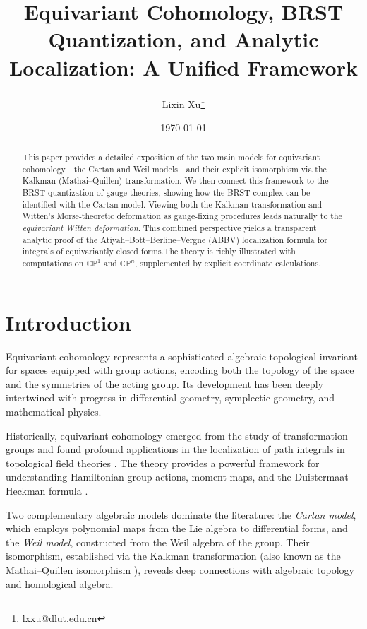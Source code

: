 \documentclass[10pt]{article}
\title{Equivariant Cohomology, BRST Quantization, and Analytic Localization: A Unified Framework}
\author{Lixin Xu\footnote{lxxu@dlut.edu.cn}}
\affil{Institute of Theoretical Physics, School of Physics, Dalian University of Technology, Dalian, 116024, China}
\date{\today}
\theoremstyle{definition}
\begin{document}
\maketitle

\begin{abstract}
This paper provides a detailed exposition of the two main models for equivariant cohomology---the Cartan and Weil models---and their explicit isomorphism via the Kalkman (Mathai--Quillen) transformation. We then connect this framework to the BRST quantization of gauge theories, showing how the BRST complex can be identified with the Cartan model. Viewing both the Kalkman transformation and Witten's Morse-theoretic deformation as gauge-fixing procedures leads naturally to the \emph{equivariant Witten deformation}. This combined perspective yields a transparent analytic proof of the Atiyah--Bott--Berline--Vergne (ABBV) localization formula for integrals of equivariantly closed forms.The theory is richly illustrated with computations on $\mathbb{CP}^1$ and $\mathbb{CP}^n$, supplemented by explicit coordinate calculations. 
\end{abstract}

\section{Introduction}\label{sec:intro}
Equivariant cohomology represents a sophisticated algebraic-topological invariant for spaces equipped with group actions, encoding both the topology of the space and the symmetries of the acting group. Its development has been deeply intertwined with progress in differential geometry, symplectic geometry, and mathematical physics. 

Historically, equivariant cohomology emerged from the study of transformation groups and found profound applications in the localization of path integrals in topological field theories \cite{Szabo2000, Witten1982, AtiyahBott1984}. The theory provides a powerful framework for understanding Hamiltonian group actions, moment maps, and the Duistermaat--Heckman formula \cite{DuistermaatHeckman1982, BerlineVergne1982}.

Two complementary algebraic models dominate the literature: the \emph{Cartan model}, which employs polynomial maps from the Lie algebra to differential forms, and the \emph{Weil model}, constructed from the Weil algebra of the group. Their isomorphism, established via the Kalkman transformation (also known as the Mathai--Quillen isomorphism \cite{MathaiQuillen1986}), reveals deep connections with algebraic topology and homological algebra.
\end{document}
